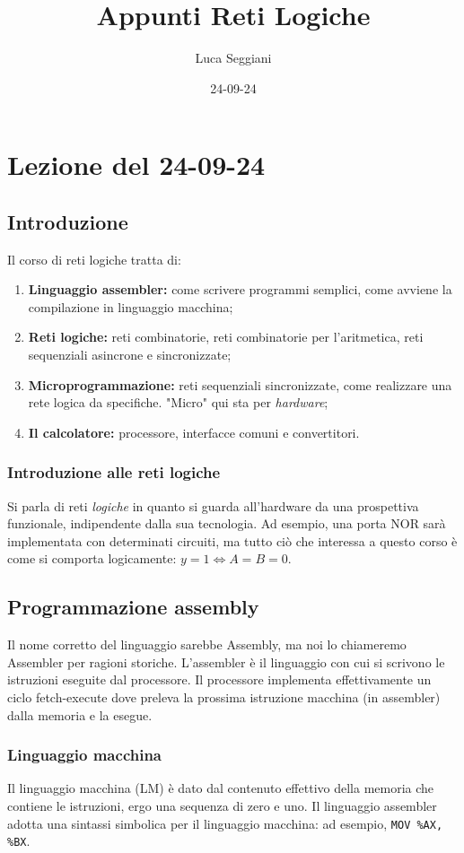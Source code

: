 \documentclass[a4paper,11pt]{article}
\title{Appunti Reti Logiche}
\author{Luca Seggiani}
\date{24-09-24}
\begin{document}
\section{Lezione del 24-09-24}

\thispagestyle{empty}
\pagestyle{fancy}

\subsection{Introduzione}
Il corso di reti logiche tratta di:
\begin{enumerate}
	\item \textbf{Linguaggio assembler:} come scrivere programmi semplici, come avviene la compilazione in linguaggio macchina;
	\item \textbf{Reti logiche:} reti combinatorie, reti combinatorie per l'aritmetica, reti sequenziali asincrone e sincronizzate;
	\item \textbf{Microprogrammazione:} reti sequenziali sincronizzate, come realizzare una rete logica da specifiche. 
		"Micro" qui sta per \textit{hardware};
	\item \textbf{Il calcolatore:} processore, interfacce comuni e convertitori.
\end{enumerate}

\subsubsection{Introduzione alle reti logiche}
Si parla di reti \textit{logiche} in quanto si guarda all'hardware da una prospettiva funzionale, indipendente dalla sua tecnologia.
Ad esempio, una porta NOR sarà implementata con determinati circuiti, ma tutto ciò che interessa a questo corso è come si comporta logicamente: $ y = 1 \Leftrightarrow A = B = 0 $.

\subsection{Programmazione assembly}
Il nome corretto del linguaggio sarebbe Assembly, ma noi lo chiameremo Assembler per ragioni storiche.
L'assembler è il linguaggio con cui si scrivono le istruzioni eseguite dal processore.
Il processore implementa effettivamente un ciclo fetch-execute dove preleva la prossima istruzione macchina (in assembler) dalla memoria e la esegue.

\subsubsection{Linguaggio macchina}
Il linguaggio macchina (LM) è dato dal contenuto effettivo della memoria che contiene le istruzioni, ergo una sequenza di zero e uno.
Il linguaggio assembler adotta una sintassi simbolica per il linguaggio macchina: ad esempio, \texttt{MOV \%AX, \%BX}.
\end{document}
